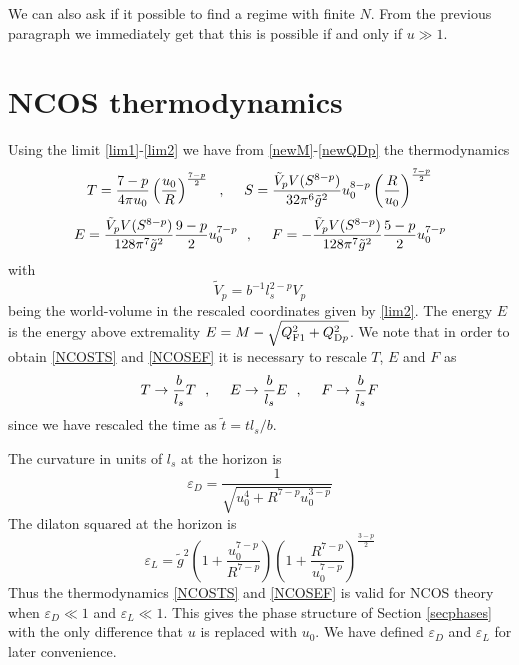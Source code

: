 \documentclass[a4paper,twoside,titlepage,12pt]{article}
\begin{document}
We can also ask if it possible to find a regime with finite $N$. 
From the previous paragraph we immediately get that this is
possible if and only if \( u \gg 1 \).


\section{NCOS thermodynamics}
\label{secthermo}

Using the limit \eqref{lim1}-\eqref{lim2}
we have from \eqref{newM}-\eqref{newQDp} the thermodynamics 
%
\begin{equation}
\label{NCOSTS}
T = \frac{7-p}{4\pi u_0} \left( \frac{u_0}{R} \right)^{\frac{7-p}{2}}
\ \ ,\ \ \ \ 
S = \frac{\tilde{V}_p V(S^{8-p}) }{32 \pi^6 \tilde{g}^2} u_0^{8-p} 
\left( \frac{R}{u_0} \right)^{\frac{7-p}{2}}
\end{equation}
%
\begin{equation}
\label{NCOSEF}
E = \frac{\tilde{V}_p V(S^{8-p}) }{128 \pi^7 \tilde{g}^2} 
\frac{9-p}{2} u_0^{7-p}
\ \ ,\ \ \ \ 
F = - \frac{\tilde{V}_p V(S^{8-p}) }{128 \pi^7 \tilde{g}^2} 
\frac{5-p}{2} u_0^{7-p}
\end{equation}
%
with 
%
\begin{equation}
\tilde{V}_p = b^{-1} l_s^{2-p} V_p
\end{equation}
%
being the world-volume in the rescaled coordinates given by \eqref{lim2}.
The energy $E$ is the energy above extremality 
$E = M - \sqrt{ Q_{\rm F1}^2 + Q_{{\rm D}p}^2 } $.
We note that in order to obtain \eqref{NCOSTS} and \eqref{NCOSEF} 
it is necessary to rescale $T$, $E$ and $F$ as
%
\begin{equation}
T \rightarrow \frac{b}{l_s} T
\ \ ,\ \ \ \ 
E \rightarrow \frac{b}{l_s} E
\ \ ,\ \ \ \  
F \rightarrow \frac{b}{l_s} F
\end{equation}
%
since we have rescaled the time as \( \tilde{t} = t l_s /b \).

The curvature in units of \( l_s \) at the horizon is
%
\begin{equation}
\label{epsD}
\varepsilon_D = \frac{1}{\sqrt{u_0^4 + R^{7-p} u_0^{3-p} }}
\end{equation}
%
The dilaton squared at the horizon is
%
\begin{equation}
\label{epsL}
\varepsilon_L = \tilde{g}^2 \left( 1 + \frac{u_0^{7-p}}{R^{7-p}} \right)
\left( 1 + \frac{R^{7-p}}{u_0^{7-p}} \right)^{\frac{3-p}{2}}
\end{equation}
%
Thus the thermodynamics \eqref{NCOSTS} and \eqref{NCOSEF} is
valid for NCOS theory when \( \varepsilon_D \ll 1 \) and \( \varepsilon_L \ll 1 \).
This gives the phase structure of Section \ref{secphases} 
with the only difference
that $u$ is replaced with $u_0$. 
We have defined $\varepsilon_D$ and $\varepsilon_L$ for later convenience.
\end{document}
